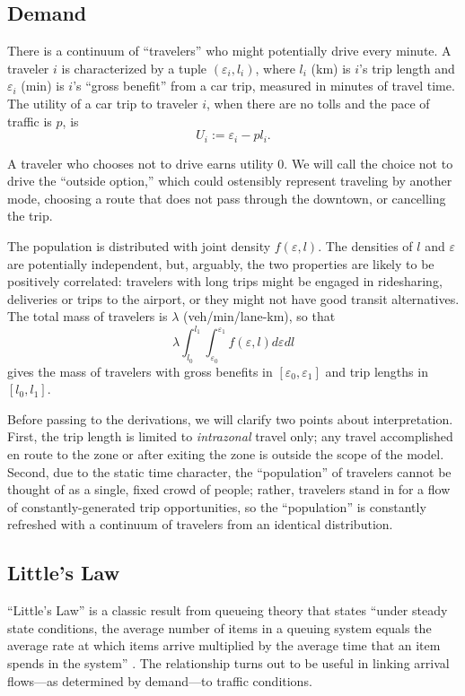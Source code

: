 \documentclass[preprint,authoryear]{elsarticle}
\newcommand{\ve}{\varepsilon}
\begin{document}
\subsection{Demand}
\label{ssec:demand}

There is a continuum of ``travelers'' who might potentially drive every minute. A traveler $i$ is characterized by a tuple $(\ve_i,l_i)$, where $l_i$ (km) is $i$'s trip length and $\ve_i$ (min) is $i$'s ``gross benefit'' from a car trip, measured in minutes of travel time. The utility of a car trip to traveler $i$, when there are no tolls and the pace of traffic is $p$, is
\begin{equation}
	U_i := \ve_i - pl_i.
\end{equation}

A traveler who chooses not to drive earns utility 0. We will call the choice not to drive the ``outside option,'' which could ostensibly represent traveling by another mode, choosing a route that does not pass through the downtown, or cancelling the trip.

The population is distributed with joint density $f(\ve,l)$. The densities of $l$ and $\ve$ are potentially independent, but, arguably, the two properties are likely to be positively correlated: travelers with long trips might be engaged in ridesharing, deliveries or trips to the airport, or they might not have good transit alternatives. The total mass of travelers is $\lambda$ (veh/min/lane-km), so that 
$$
\lambda \int_{l_0}^{l_1}\int_{\ve_0}^{\ve_1}f(\ve,l)d\ve dl
$$
gives the mass of travelers with gross benefits in $[\ve_0,\ve_1]$ and trip lengths in $[l_0,l_1]$.

Before passing to the derivations, we will clarify two points about interpretation. First, the trip length is limited to \emph{intrazonal} travel only; any travel accomplished en route to the zone or after exiting the zone is outside the scope of the model. Second, due to the static time character, the ``population'' of travelers cannot be  thought of as a single, fixed crowd of people; rather, travelers stand in for a flow of constantly-generated trip opportunities, so the ``population'' is constantly refreshed with a continuum of travelers from an identical distribution.

\subsection{Little's Law}

``Little's Law'' is a classic result from queueing theory that states ``under steady state conditions, the average number of items in a queuing system equals the average rate at which items arrive multiplied by the average time that an item spends in the system'' \citep[p. 82]{Little2008}. The relationship turns out to be useful in linking arrival flows---as determined by demand---to traffic conditions.
\end{document}
